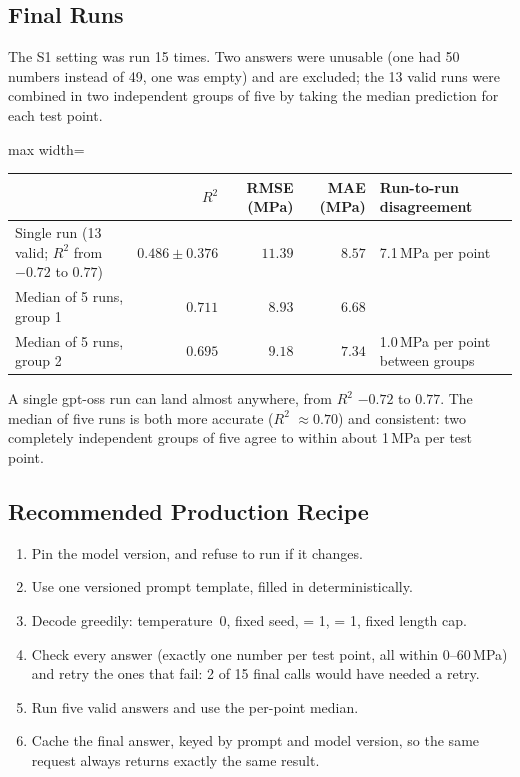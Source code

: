 \documentclass[11pt]{article}
\newcommand{\R}{$R^2$}
\begin{document}
\subsection{Final Runs}
\label{sec:p3-final-llm}
The S1 setting was run 15 times. Two answers were unusable (one had 50 numbers instead
of 49, one was empty) and are excluded; the 13 valid runs were combined in two
independent groups of five by taking the median prediction for each test point.

\begin{center}\small
\begin{adjustbox}{max width=\linewidth}
\begin{tabular}{lrrrl}
\toprule
& \R{} & RMSE (MPa) & MAE (MPa) & Run-to-run disagreement \\
\midrule
Single run (13 valid; \R{} from $-0.72$ to $0.77$) & $0.486\pm0.376$ & $11.39$ & $8.57$ & 7.1\,MPa per point \\
\rowcolor{green!12}Median of 5 runs, group 1 & $\mathbf{0.711}$ & $\mathbf{8.93}$ & $\mathbf{6.68}$ & \\
\rowcolor{green!12}Median of 5 runs, group 2 & $\mathbf{0.695}$ & $\mathbf{9.18}$ & $\mathbf{7.34}$ & 1.0\,MPa per point between groups \\
\bottomrule
\end{tabular}
\end{adjustbox}
\end{center}

\noindent A single gpt-oss run can land almost anywhere, from \R{} $-0.72$ to $0.77$.
The median of five runs is both more accurate (\R{} $\approx0.70$) and consistent: two
completely independent groups of five agree to within about 1\,MPa per test point.

\subsection{Recommended Production Recipe}
\label{sec:p3-recipe}
\begin{enumerate}\itemsep2pt
  \item Pin the model version, and refuse to run if it changes.
  \item Use one versioned prompt template, filled in deterministically.
  \item Decode greedily: temperature~0, fixed seed,  = 1,  = 1,
        fixed length cap.
  \item Check every answer (exactly one number per test point, all within 0--60\,MPa) and
        retry the ones that fail: 2 of 15 final calls would have needed a retry.
  \item Run five valid answers and use the per-point median.
  \item Cache the final answer, keyed by prompt and model version, so the same request
        always returns exactly the same result.
\end{enumerate}
\end{document}
